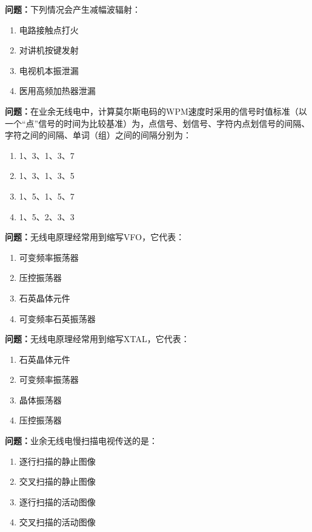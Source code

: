 \bigskip


\noindent\textbf{问题：}下列情况会产生减幅波辐射：
\begin{enumerate}[label=\Alph*), leftmargin=3em]
\item 电路接触点打火
\item 对讲机按键发射
\item 电视机本振泄漏
\item 医用高频加热器泄漏
\end{enumerate}

\bigskip


\noindent\textbf{问题：}在业余无线电中，计算莫尔斯电码的WPM速度时采用的信号时值标准（以一个“点”信号的时间为比较基准）为，点信号、划信号、字符内点划信号的间隔、字符之间的间隔、单词（组）之间的间隔分别为：
\begin{enumerate}[label=\Alph*), leftmargin=3em]
\item 1、3、1、3、7
\item 1、3、1、3、5
\item 1、5、1、5、7
\item 1、5、2、3、3
\end{enumerate}

\bigskip


\noindent\textbf{问题：}无线电原理经常用到缩写VFO，它代表：
\begin{enumerate}[label=\Alph*), leftmargin=3em]
\item 可变频率振荡器
\item 压控振荡器
\item 石英晶体元件
\item 可变频率石英振荡器
\end{enumerate}

\bigskip


\noindent\textbf{问题：}无线电原理经常用到缩写XTAL，它代表：
\begin{enumerate}[label=\Alph*), leftmargin=3em]
\item 石英晶体元件
\item 可变频率振荡器
\item 晶体振荡器
\item 压控振荡器
\end{enumerate}

\bigskip


\noindent\textbf{问题：}业余无线电慢扫描电视传送的是：
\begin{enumerate}[label=\Alph*), leftmargin=3em]
\item 逐行扫描的静止图像
\item 交叉扫描的静止图像
\item 逐行扫描的活动图像
\item 交叉扫描的活动图像
\end{enumerate}

